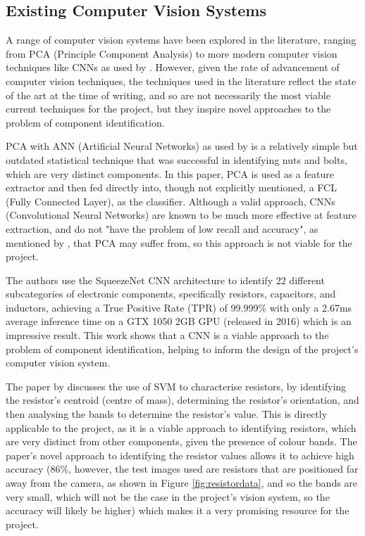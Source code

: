 \subsection{Existing Computer Vision Systems}
A range of computer vision systems have been explored in the literature, ranging from PCA (Principle Component Analysis) \citet{Dhenge2013MechanicalNS} to more modern computer vision techniques like CNNs as used by \citet{Xu2020,s22239079}. However, given the rate of advancement of computer vision
techniques, the techniques used in the literature reflect the state of the art at the time of writing, and so are not necessarily the most viable current techniques for the project, but they inspire novel approaches to the problem of component identification.

PCA with ANN (Artificial Neural Networks) as used by \citet{Dhenge2013MechanicalNS} is a relatively simple but outdated statistical technique that was successful in identifying nuts and bolts, which are very distinct components. 
In this paper, PCA is used as a feature extractor and then fed directly into, though not explicitly mentioned, a FCL (Fully Connected Layer), as the classifier. Although a valid approach, CNNs (Convolutional Neural Networks) are known to be much more
effective at feature extraction, and do not "have the problem of low recall and accuracy", as mentioned by \citet{Xu2020}, that PCA may suffer from, so this approach is not viable for the project. 

The authors \citet{Xu2020} use the SqueezeNet CNN architecture to identify 22 different subcategories of electronic components, specifically resistors, capacitors, and inductors, achieving a True Positive Rate (TPR) of 99.999\% with only a 2.67ms average inference time on a 
GTX 1050 2GB GPU (released in 2016) which is an impressive result. This work shows that a CNN is a viable approach to the problem of component identification, helping to inform the design of the project's computer vision system.

The paper by \citet{8939034} discusses the use of SVM to characterise resistors, by identifying the resistor's centroid (centre of mass), determining the resistor's orientation, and then analysing the bands to determine the resistor's value.
This is directly applicable to the project, as it is a viable approach to identifying resistors, which are very distinct from other components, given the presence of colour bands. The paper's novel approach to identifying the resistor values allows it to achieve high accuracy (86\%, however,
the test images used are resistors that are positioned far away from the camera, as shown in Figure \ref*{fig:resistordata}, and so the bands are very small, which will not be the case in the project's vision system, so the accuracy will likely be higher) which makes it a very promising resource for the project.

